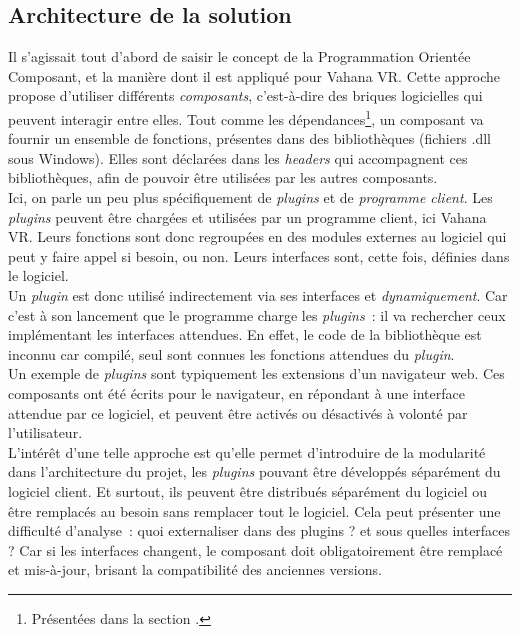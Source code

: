 \subsection{Architecture de la solution}
Il s'agissait tout d'abord de saisir le concept de la Programmation Orientée Composant, et la manière
dont il est appliqué pour Vahana VR.
Cette approche propose d'utiliser différents \emph{composants}, c'est-à-dire des briques logicielles
qui peuvent interagir entre elles. Tout comme les dépendances\footnote{Présentées dans 
la section .}, un composant va fournir un ensemble
de fonctions, présentes dans des bibliothèques (fichiers .dll sous Windows). Elles sont
déclarées dans les \textit{headers} qui accompagnent ces bibliothèques, afin de 
pouvoir être utilisées par les autres composants.\cite{poc}\\
Ici, on parle un peu plus spécifiquement de \textit{plugins} et de \emph{programme client}.
Les \textit{plugins} peuvent être chargées et utilisées par un programme client, 
ici Vahana VR. Leurs fonctions sont donc regroupées en des modules externes
au logiciel qui peut y faire appel si besoin, ou non. Leurs interfaces sont, cette
fois, définies dans le logiciel.\cite{plugin}\\
Un \textit{plugin} est donc utilisé indirectement via ses interfaces et \emph{dynamiquement}.
Car c'est à son lancement que le programme charge les \textit{plugins}~:
il va rechercher ceux implémentant les interfaces attendues. En effet,
le code de la bibliothèque est inconnu car compilé, seul sont connues les fonctions 
attendues du \textit{plugin}.\\
\newline
Un exemple de \textit{plugins} sont typiquement les extensions d'un navigateur web. Ces composants
ont été écrits pour le navigateur, en répondant à une interface attendue par ce logiciel,
et peuvent être activés ou désactivés à volonté par l'utilisateur.\\
L'intérêt d'une telle approche est qu'elle permet d'introduire de la modularité dans 
l'architecture du projet, les \textit{plugins} pouvant être développés séparément du logiciel
client. Et surtout, ils peuvent être distribués séparément du logiciel ou être remplacés
au besoin sans remplacer tout le logiciel. Cela peut présenter une difficulté d'analyse~:
quoi externaliser dans des plugins ? et sous quelles interfaces ? Car si les interfaces
changent, le composant doit obligatoirement être remplacé et mis-à-jour, brisant la compatibilité
des anciennes versions.\cite{poc}\\ 
